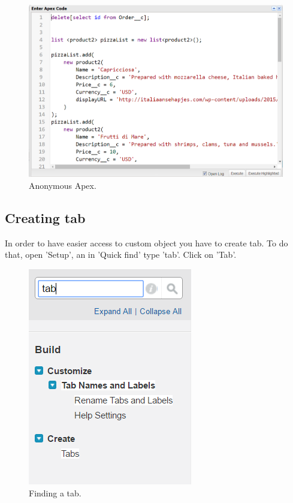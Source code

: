 \documentclass[12pt,a4paper]{article}
\begin{document}
\begin{figure}[H]
	\centering
	\includegraphics[width=1\textwidth]{images/deploy2.PNG}
	\caption{Anonymous Apex.}
	\label{fig:apex}
\end{figure}

\subsection{Creating tab}

In order to have easier access to custom object you have to create tab. To do that, open 'Setup', an in 'Quick find' type 'tab'. Click on 'Tab'.

\begin{figure}[H]
	\centering
	\includegraphics{images/tab.PNG}
	\caption{Finding a tab.}
	\label{fig:tab}
\end{figure}
\end{document}
